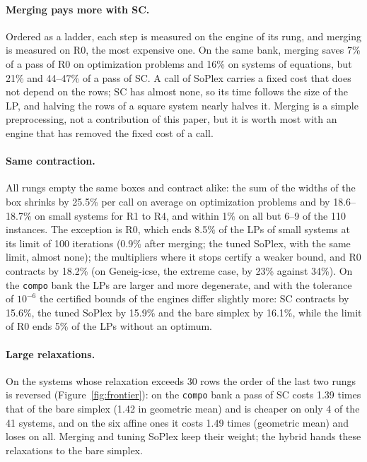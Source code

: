 \documentclass[11pt]{article}
\theoremstyle{definition}
\theoremstyle{remark}
\begin{document}
\paragraph{Merging pays more with SC.}
Ordered as a ladder, each step is measured on the engine of its rung, and
merging is measured on R0, the most expensive one. On the same bank, merging
saves 7\% of a pass of R0 on optimization problems and 16\% on systems of
equations, but 21\% and 44--47\% of a pass of SC. A call of SoPlex carries a
fixed cost that does not depend on the rows; SC has almost none, so its time
follows the size of the LP, and halving the rows of a square system nearly
halves it. Merging is a simple preprocessing, not a contribution of this
paper, but it is worth most with an engine that has removed the fixed cost of
a call.

\paragraph{Same contraction.}
All rungs empty the same boxes and contract alike: the sum of the widths of
the box shrinks by 25.5\% per call on average on optimization problems and
by 18.6--18.7\% on small systems for R1 to R4, and
within 1\% on all but 6--9 of the 110 instances. The exception is R0, which
ends 8.5\% of the LPs of small systems at its limit of 100 iterations
(0.9\% after merging; the tuned SoPlex, with the same limit, almost none); the
multipliers where it stops certify a weaker bound, and R0 contracts by 18.2\%
(on Geneig-icse, the extreme case, by 23\% against 34\%). On the \texttt{compo}
bank the LPs are larger and more degenerate, and with the tolerance of
$10^{-6}$ the certified bounds of the engines differ slightly more: SC
contracts by 15.6\%, the tuned SoPlex by 15.9\% and the bare simplex by 16.1\%,
while the limit of R0 ends 5\% of the LPs without an optimum.

\paragraph{Large relaxations.}
On the systems whose relaxation exceeds 30 rows the order of the last two
rungs is reversed (Figure~\ref{fig:frontier}): on the \texttt{compo} bank a
pass of SC costs 1.39 times that of the bare simplex (1.42 in geometric mean)
and is cheaper on only 4 of the 41 systems, and on the six affine ones it
costs 1.49 times (geometric mean) and loses on all. Merging and tuning SoPlex keep their
weight; the hybrid hands these relaxations to the bare simplex.
\end{document}
